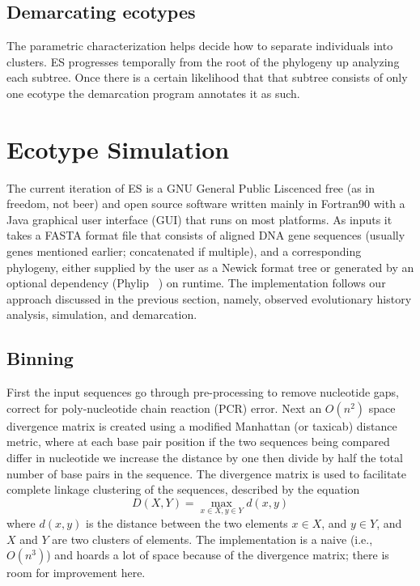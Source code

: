 \subsection*{Demarcating ecotypes}
The parametric characterization helps decide how to separate individuals into clusters.
ES progresses temporally from the root of the phylogeny up analyzing each subtree.
Once there is a certain likelihood that that subtree consists of only one ecotype the demarcation program annotates it as such.


\section{Ecotype Simulation}
The current iteration of ES is a GNU General Public Liscenced free (as in freedom, not beer) and open source software written mainly in Fortran90 with a Java graphical user interface (GUI) that runs on most platforms.
As inputs it takes a FASTA format file that consists of aligned DNA gene sequences (usually genes mentioned earlier; concatenated if multiple), and a corresponding phylogeny, either supplied by the user as a Newick format tree or generated by an optional dependency (Phylip ~\cite{felsenstein1989phylip}) on runtime.
The implementation follows our approach discussed in the previous section, namely, observed evolutionary history analysis, simulation, and demarcation.

\subsection*{Binning}
First the input sequences go through pre-processing to remove nucleotide gaps, correct for poly-nucleotide chain reaction (PCR) error.
Next an $O(n^2)$ space divergence matrix is created using a modified Manhattan (or taxicab) distance metric, where at each base pair position if the two sequences being compared differ in nucleotide we increase the distance by one then divide by half the total number of base pairs in the sequence.
The divergence matrix is used to facilitate complete linkage clustering of the sequences, described by the equation $$D(X,Y)= \max_{x\in X, y\in Y} d(x,y)$$ where $d(x,y)$ is the distance between the two elements $x \in X$, and $y \in Y$, and $X$ and $Y$ are two clusters of elements.
The implementation is a naive (i.e., $O(n^3)$) and hoards a lot of space because of the divergence matrix; there is room for improvement here. 

